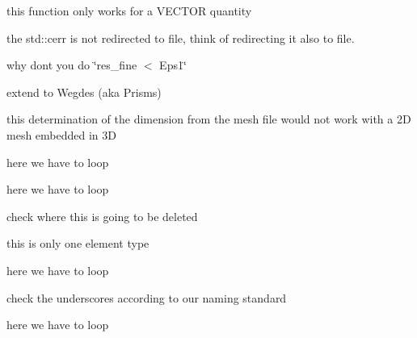 
\begin{DoxyRefList}
\item[\label{todo__todo000001}%
\Hypertarget{todo__todo000001}%
Member \mbox{\hyperlink{classfemus_1_1_current_quantity_ac49ad9c2373c209ecc2b54eb3d0cde9d}{femus\+:\+:Current\+Quantity\+:\+:curl\+\_\+g}} ()]this function only works for a V\+E\+C\+T\+OR quantity  
\item[\label{todo__todo000013}%
\Hypertarget{todo__todo000013}%
Member \mbox{\hyperlink{classfemus_1_1_gen_case_a2b47da5519d3b8d3d3d4778bc07deef3}{femus\+:\+:Gen\+Case\+:\+:Read\+Matrix}} (const std\+::string \&name, \mbox{\hyperlink{classfemus_1_1_system_two}{System\+Two}} $\ast$mysys)]the std\+::cerr is not redirected to file, think of redirecting it also to file.  
\item[\label{todo__todo000002}%
\Hypertarget{todo__todo000002}%
Member \mbox{\hyperlink{classfemus_1_1_linear_implicit_system_a213ed6f52d201362753935f67e0ba30f}{femus\+:\+:Linear\+Implicit\+System\+:\+:M\+G\+Solve}} (double Eps, int Max\+Iter, const uint Gamma=D\+E\+F\+A\+U\+L\+T\+\_\+\+M\+G\+\_\+\+G\+A\+M\+MA, const uint Nc\+\_\+pre=D\+E\+F\+A\+U\+L\+T\+\_\+\+N\+C\+\_\+\+P\+RE, const uint Nc\+\_\+coarse=D\+E\+F\+A\+U\+L\+T\+\_\+\+N\+C\+\_\+\+C\+O\+A\+R\+SE, const uint Nc\+\_\+post=D\+E\+F\+A\+U\+L\+T\+\_\+\+N\+C\+\_\+\+P\+O\+ST)]why dont you do \char`\"{}res\+\_\+fine $<$ Eps1\char`\"{}  
\item[\label{todo__todo000004}%
\Hypertarget{todo__todo000004}%
Member \mbox{\hyperlink{classfemus_1_1_salome_i_o_a2cd7f5327fe664747acc0131bf6a657e}{femus\+:\+:Salome\+IO\+:\+:read}} (const std\+::string \&name, vector$<$ vector$<$ double $>$ $>$ \&coords, const double Lref, std\+::vector$<$ bool $>$ \&type\+\_\+elem\+\_\+flag)]extend to Wegdes (aka Prisms) 

this determination of the dimension from the mesh file would not work with a 2D mesh embedded in 3D 

here we have to loop 

here we have to loop 

check where this is going to be deleted 

this is only one element type 

here we have to loop 

check the underscores according to our naming standard 

here we have to loop 
\end{DoxyRefList}